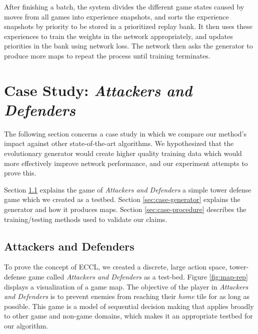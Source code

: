 \documentclass[letterpaper]{article} %
\begin{document}

After finishing a batch, the system divides the different game states caused by moves from all games into experience snapshots, and sorts the experience snapshots by priority to be stored in a prioritized replay bank. It then uses these experiences to train the weights in the network appropriately, and updates priorities in the bank using network loss. The network then asks the generator to produce more maps to repeat the process until training terminates.


\section{Case Study: \textit{Attackers and Defenders}}\label{sec:case}
The following section concerns a case study in which we compare our method's impact against other state-of-the-art algorithms. We hypothesized that the evolutionary generator would create higher quality training data which would more effectively improve network performance, and our experiment attempts to prove this. 

Section \ref{sec:case-game} explains the game of \textit{Attackers and Defenders} a simple tower defense game which we created as a testbed. Section \ref{sec:case-generator} explains the generator and how it produces maps. Section \ref{sec:case-procedure} describes the training/testing methods used to validate our claims.

\subsection{Attackers and Defenders}\label{sec:case-game}
To prove the concept of ECCL, we created a discrete, large action space, tower-defense game called \textit{Attackers and Defenders} as a test-bed. Figure \ref{fig:map-rep} displays a visualization of a game map. The objective of the player in \textit{Attackers and Defenders} is to prevent enemies from reaching their \textit{home} tile for as long as possible. This game is a model of sequential decision making that applies broadly to other game and non-game domains, which makes it an appropriate testbed for our algorithm.
\end{document}
